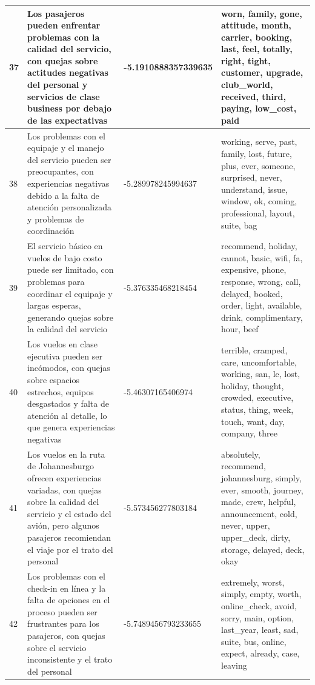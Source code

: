 \documentclass{report}
\begin{document}
{{\begin{longtable}{|p{1cm}|p{4cm}|p{4cm}|p{6cm}|}
                    \hline
                    37 & Los pasajeros pueden enfrentar problemas con la calidad del servicio, con quejas sobre actitudes negativas del personal y servicios de clase business por debajo de las expectativas & -5.1910888357339635 & worn, family, gone, attitude, month, carrier, booking, last, feel, totally, right, tight, customer, upgrade, club\_world, received, third, paying, low\_cost, paid \\
                    \hline
                    38 & Los problemas con el equipaje y el manejo del servicio pueden ser preocupantes, con experiencias negativas debido a la falta de atención personalizada y problemas de coordinación & -5.289978245994637 & working, serve, past, family, lost, future, plus, ever, someone, surprised, never, understand, issue, window, ok, coming, professional, layout, suite, bag \\
                    \hline
                    39 & El servicio básico en vuelos de bajo costo puede ser limitado, con problemas para coordinar el equipaje y largas esperas, generando quejas sobre la calidad del servicio & -5.376335468218454 & recommend, holiday, cannot, basic, wifi, fa, expensive, phone, response, wrong, call, delayed, booked, order, light, available, drink, complimentary, hour, beef \\
                    \hline
                    40 & Los vuelos en clase ejecutiva pueden ser incómodos, con quejas sobre espacios estrechos, equipos desgastados y falta de atención al detalle, lo que genera experiencias negativas & -5.46307165406974 & terrible, cramped, care, uncomfortable, working, san, le, lost, holiday, thought, crowded, executive, status, thing, week, touch, want, day, company, three \\
                    \hline
                    41 & Los vuelos en la ruta de Johannesburgo ofrecen experiencias variadas, con quejas sobre la calidad del servicio y el estado del avión, pero algunos pasajeros recomiendan el viaje por el trato del personal & -5.573456277803184 & absolutely, recommend, johannesburg, simply, ever, smooth, journey, made, crew, helpful, announcement, cold, never, upper, upper\_deck, dirty, storage, delayed, deck, okay \\
                    \hline
                    42 & Los problemas con el check-in en línea y la falta de opciones en el proceso pueden ser frustrantes para los pasajeros, con quejas sobre el servicio inconsistente y el trato del personal & -5.7489456793233655 & extremely, worst, simply, empty, worth, online\_check, avoid, sorry, main, option, last\_year, least, sad, suite, bus, online, expect, already, case, leaving \\

\end{longtable}}}
\end{document}
